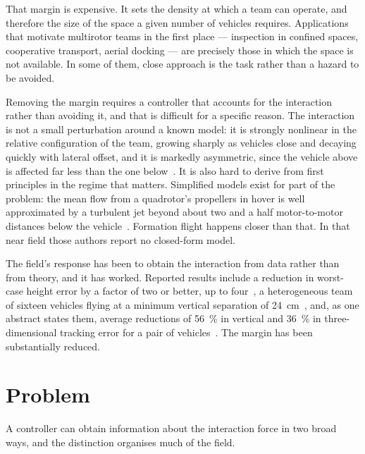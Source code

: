 That margin is expensive. It sets the density at which a team can operate, and therefore the size
of the space a given number of vehicles requires. Applications that motivate multirotor teams in the first place --- inspection in confined spaces,
cooperative transport, aerial docking --- are precisely those in which the space is not available. In some of them, close approach is the task
rather than a hazard to be avoided.

Removing the margin requires a controller that accounts for the interaction rather than avoiding
it, and that is difficult for a specific reason. The interaction is not a small perturbation
around a known model: it is strongly nonlinear in the relative configuration of the team, growing
sharply as vehicles close and decaying quickly with lateral offset, and it is markedly asymmetric,
since the vehicle above is affected far less than the one below~\cite{kiran2025downwash,gielis2023aggregate}.
It is also hard to derive from
first principles in the regime that matters. Simplified models exist for part of the problem:
the mean flow from a quadrotor's propellers in hover is well approximated by a turbulent jet
beyond about two and a half motor-to-motor distances below the
vehicle~\cite{bauersfeld2024airflow}. Formation flight happens closer than that. In that near
field those authors report no closed-form model.

The field's response has been to obtain the interaction from data rather than from theory, and it
has worked. Reported results include a reduction in worst-case height error by a factor of two or
better, up to four~\cite{shi2020neuralswarm}, a heterogeneous team of sixteen vehicles flying at a
minimum vertical separation of
\SI{24}{\centi\metre}~\cite{shi2022neuralswarm2}, and, as one abstract states them, average
reductions of \SI{56}{\percent} in
vertical and \SI{36}{\percent} in three-dimensional tracking error for a pair of
vehicles~\cite{smith2023so2equivariant}.
The margin has been substantially reduced.

\section{Problem}
\label{sec:intro-problem}

A controller can obtain information about the interaction force in two broad ways, and the
distinction organises much of the field.

